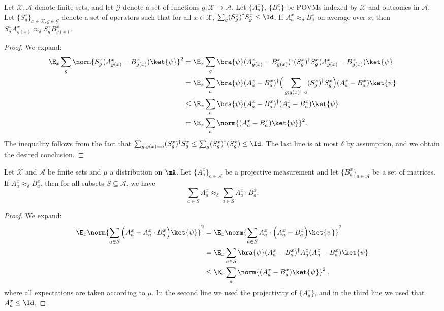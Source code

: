 \begin{fact}
\label{fact:add-a-proj2}
Let $\mathcal{X},\mathcal{A}$ denote finite sets, and let $\mathcal{G}$ denote a set of functions $g: \mathcal{X} \to \mathcal{A}$. Let $\{A^x_a \}$, $\{B^x_a\}$ be POVMs indexed by $\mathcal{X}$ and outcomes in $\mathcal{A}$. Let $\{ S_g^x \}_{x\in \mathcal{X}, g\in\mathcal{G}}$ denote a set of operators such that for all $x \in \mathcal{X}$, $\sum_g (S_g^x)^\dagger S_g^x \leq \Id$. 
If $A^x_a \approx_\delta B^x_a$ on average over $x$, then $S_g^x A^x_{g(x)} \approx_\delta S_g^x B^x_{g(x)}$. 
\end{fact}
\begin{proof}
	We expand:
	\begin{align*}
		\E_x \sum_g \norm{ S^x_g (A^x_{g(x)} - B^x_{g(x)}) \ket{\psi}}^2 &= \E_x \sum_g \bra{\psi} (A^x_{g(x)} - B^x_{g(x)})^\dagger  (S_g^x)^\dagger S_g^x (A^x_{g(x)} - B^x_{g(x)}) \ket{\psi} \\
		&= \E_x \sum_a \bra{\psi} (A^x_a - B^x_a)^\dagger  \Big(\sum_{g: g(x) = a} (S_g^x)^\dagger S_g^x \Big) (A^x_a - B^x_a) \ket{\psi} \\
		&\leq \E_x \sum_a \bra{\psi} (A^x_a - B^x_a)^\dagger (A^x_a - B^x_a) \ket{\psi} \\
		&= \E_x \sum_a \norm{ (A^x_a - B^x_a) \ket{\psi} }^2.
	\end{align*}
	The inequality follows from the fact that $\sum_{g: g(x) = a} (S_g^x)^\dagger S_g^x \leq \sum_g (S_g^x)^\dagger (S_g^x) \leq \Id$. The last line is at most $\delta$ by assumption, and we obtain the desired conclusion.
\end{proof}


\begin{lemma}
\label{lem:cool-closeness-fact}
Let $\mathcal{X}$ and $\mathcal{A}$ be finite sets and $\mu$ a distribution on $\mX$. Let $\{A^x_a\}_{a \in \mathcal{A}}$ be a projective measurement and let $\{B^x_a\}_{a \in \mathcal{A}}$ be a set of matrices. If $A^x_a \approx_\delta B^x_a$, then for all subsets $S \subseteq \mathcal{A}$, we have
\[
	\sum_{a \in S} A^x_a \approx_\delta \sum_{a \in S} A^x_a \cdot B^x_a.
\]
\end{lemma}
\begin{proof}
We expand:
\begin{align*}
	\E_x \norm{ \sum_{a \in S} \Big(A^x_a - A^x_a \cdot B^x_a\Big) \ket{\psi}}^2 &= \E_x \norm{ \sum_{a \in S} A^x_a \cdot \Big(A^x_a - B^x_a\Big) \ket{\psi}}^2 \\
	&= \E_x \sum_{a \in S} \bra{\psi} (A^x_a - B^x_a)^\dagger A^x_a (A^x_a - B^x_a) \ket{\psi} \\
	&\leq \E_x \sum_a \norm{ (A^x_a -  B^x_a) \ket{\psi}}^2\;,
\end{align*}
where all expectations are taken according to $\mu$. 
In the second line we used the projectivity of $\{ A^x_a \}$, and in the third line we used that $A^x_a \leq \Id$.
\end{proof}


